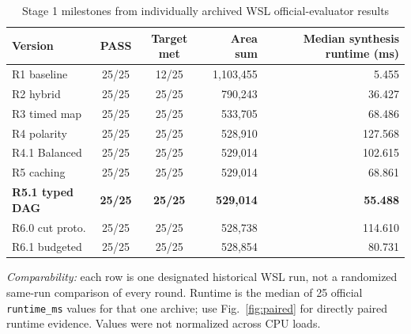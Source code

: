 \begin{table}[!t]
\centering\caption{Stage 1 milestones from individually archived WSL official-evaluator results}\label{tab:milestones}
\small\setlength{\tabcolsep}{11pt}
\begin{tabular}{@{}lccrr@{}}\toprule
Version & PASS & Target met & Area sum & Median synthesis runtime (ms) \\ \midrule
R1 baseline & 25/25 & 12/25 & 1,103,455 & 5.455 \\
R2 hybrid & 25/25 & 25/25 & 790,243 & 36.427 \\
R3 timed map & 25/25 & 25/25 & 533,705 & 68.486 \\
R4 polarity & 25/25 & 25/25 & 528,910 & 127.568 \\
R4.1 Balanced & 25/25 & 25/25 & 529,014 & 102.615 \\
R5 caching & 25/25 & 25/25 & 529,014 & 68.861 \\
\textbf{R5.1 typed DAG} & \textbf{25/25} & \textbf{25/25} & \textbf{529,014} & \textbf{55.488} \\
R6.0 cut proto. & 25/25 & 25/25 & 528,738 & 114.610 \\
R6.1 budgeted & 25/25 & 25/25 & 528,854 & 80.731 \\
\bottomrule\end{tabular}
\par\vspace{2pt}
\parbox{0.92\textwidth}{\footnotesize\emph{Comparability:} each row is one designated historical WSL run, not a randomized same-run comparison of every round. Runtime is the median of 25 official \texttt{runtime\_ms} values for that one archive; use Fig.~\ref{fig:paired} for directly paired runtime evidence. Values were not normalized across CPU loads.}
\end{table}
